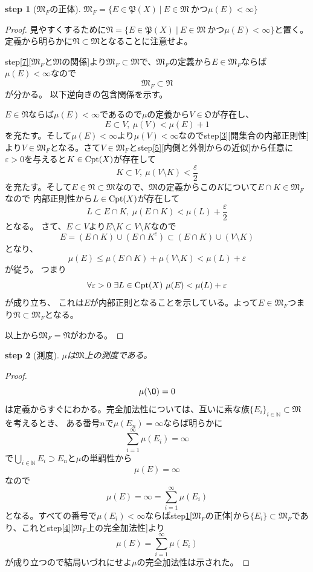 \documentclass[leqno]{jsarticle}
\newtheorem{stp}{{\bf step}}
\newcommand{\nn}{\mathbb{N}}
\newcommand{\mgn}{\infty}
\newcommand{\dpst}{\displaystyle}
\newcommand{\mm}{\mathfrak{M}}
\newcommand{\mf}{\mathfrak{M}_F}
\newcommand{\pw}{\mathfrak{P}(X)}
\newcommand{\ep}{\varepsilon}
\newcommand{\cpt}{{\rm Cpt}(X)}
\newcommand{\oo}{\mathfrak{O}}
\newcommand{\N}{\mathfrak{N}}
\begin{document}
\begin{stp}[$\mf$の正体]\label{10}
$\mf=\{E\in\pw\ |\ E\in\mm\ かつ\mu(E)<\mgn\}$
\end{stp}
\begin{proof}見やすくするために$\N=\{E\in\pw\ |\ E\in\mm\ かつ\mu(E)<\mgn\}$と置く。定義から明らかに$\N\subset \mm$となることに注意せよ。\par
step\ref{7}[$\mf$と$\mm$の関係]より$\mf\subset \mm$で、$\mf$の定義から$E\in \mf$ならば$\mu(E)<\mgn$なので
\[
\mf\subset \N
\]
が分かる。
以下逆向きの包含関係を示す。\par
$E\in \N$ならば$\mu(E)<\mgn$であるので$\mu$の定義から$V\in\oo$が存在し、
\[
E\subset V,\ \mu(V)<\mu(E)+1
\]
を充たす。そして$\mu(E)<\mgn$より$\mu(V)<\mgn$なのでstep\ref{3}[開集合の内部正則性]より$V\in\mf$となる。さて$V\in \mf$とstep\ref{5}[内側と外側からの近似]から任意に$\ep>0$を与えると$K\in \cpt$が存在して
\[
K\subset V,\ \mu(V\setminus K)<\frac{\ep}{2}
\]
を充たす。そして$E\in \N\subset \mm$なので、$\mm$の定義からこの$K$について$E\cap K\in \mf$なので
内部正則性から$L\in\cpt$が存在して
\[
L\subset E\cap K,\ \mu(E\cap K)<\mu(L)+\frac{\ep}{2}
\]となる。
さて、$E\subset V$より$E\setminus K\subset V\setminus K$なので
\[
E=(E\cap K)\cup (E\cap K^{c})\subset (E\cap K)\cup (V\setminus K)
\]
となり、
\[
\mu(E)\le \mu(E\cap K)+\mu(V\setminus K)<\mu(L)+\ep
\]
が従う。
つまり
\[
\forall \ep>0\ \exists L\in \cpt\ \mu(E)<\mu(L)+\ep
\]
が成り立ち、
これは$E$が内部正則となることを示している。よって$E\in \mf$つまり$\N\subset \mf$となる。\par
以上から$\mf=\N$がわかる。
\end{proof}


\begin{stp}[測度]\label{11}
$\mu$は$\mm$上の測度である。
\end{stp}
\begin{proof}
\[
\mu(\O)=0
\]
は定義からすぐにわかる。完全加法性については、互いに素な族$\{E_i\}_{i\in\nn}\subset \mm$を考えるとき、
ある番号$n$で$\mu(E_n)=\mgn$ならば明らかに
\[
\sum_{i=1}^{\mgn}\mu(E_i)=\mgn
\]
で$\dpst \bigcup_{i\in\nn}E_i\supset E_n$と$\mu$の単調性から
\[
\mu(E)=\mgn
\]
なので
\[
\mu(E)=\mgn=\sum_{i=1}^{\mgn}\mu(E_i)
\]
となる。すべての番号で$\mu(E_i)<\mgn$ならばstep\ref{10}[$\mf$の正体]から$\{E_i\}\subset \mf$であり、これとstep\ref{4}[$\mf$上の完全加法性]より
\[
\mu(E)=\sum_{i=1}^{\mgn}\mu(E_i)
\]
が成り立つので結局いづれにせよ$\mu$の完全加法性は示された。
\end{proof}
\end{document}
